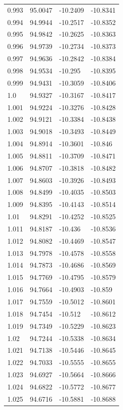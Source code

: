 \begin{tabular}{llll}
0.993 & 95.0047 & -10.2409 & -10.8341 \\
0.994 & 94.9944 & -10.2517 & -10.8352 \\
0.995 & 94.9842 & -10.2625 & -10.8363 \\
0.996 & 94.9739 & -10.2734 & -10.8373 \\
0.997 & 94.9636 & -10.2842 & -10.8384 \\
0.998 & 94.9534 & -10.295 & -10.8395 \\
0.999 & 94.9431 & -10.3059 & -10.8406 \\
1.0 & 94.9327 & -10.3167 & -10.8417 \\
1.001 & 94.9224 & -10.3276 & -10.8428 \\
1.002 & 94.9121 & -10.3384 & -10.8438 \\
1.003 & 94.9018 & -10.3493 & -10.8449 \\
1.004 & 94.8914 & -10.3601 & -10.846 \\
1.005 & 94.8811 & -10.3709 & -10.8471 \\
1.006 & 94.8707 & -10.3818 & -10.8482 \\
1.007 & 94.8603 & -10.3926 & -10.8493 \\
1.008 & 94.8499 & -10.4035 & -10.8503 \\
1.009 & 94.8395 & -10.4143 & -10.8514 \\
1.01 & 94.8291 & -10.4252 & -10.8525 \\
1.011 & 94.8187 & -10.436 & -10.8536 \\
1.012 & 94.8082 & -10.4469 & -10.8547 \\
1.013 & 94.7978 & -10.4578 & -10.8558 \\
1.014 & 94.7873 & -10.4686 & -10.8569 \\
1.015 & 94.7769 & -10.4795 & -10.8579 \\
1.016 & 94.7664 & -10.4903 & -10.859 \\
1.017 & 94.7559 & -10.5012 & -10.8601 \\
1.018 & 94.7454 & -10.512 & -10.8612 \\
1.019 & 94.7349 & -10.5229 & -10.8623 \\
1.02 & 94.7244 & -10.5338 & -10.8634 \\
1.021 & 94.7138 & -10.5446 & -10.8645 \\
1.022 & 94.7033 & -10.5555 & -10.8655 \\
1.023 & 94.6927 & -10.5664 & -10.8666 \\
1.024 & 94.6822 & -10.5772 & -10.8677 \\
1.025 & 94.6716 & -10.5881 & -10.8688 \\

\end{tabular}
